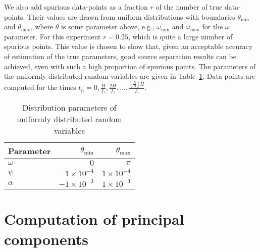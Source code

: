 We also add spurious data-points as a fraction $r$ of the number of true
data-points.  Their values are drawn from uniform distributions with boundaries
$\theta_{\text{min}}$ and $\theta_{\text{max}}$, where $\theta$ is some
parameter above, e.g., $\omega_{\text{min}}$ and $\omega_{\text{max}}$ for the
$\omega$ parameter. For this experiment $r = 0.25$, which is quite a large
number of spurious points. This value is chosen to show that, given an
acceptable accuracy of estimation of the true parameters, good source separation
results can be achieved, even with such a high proportion of spurious points.
The parameters of the uniformly distributed random variables are given in
Table~\ref{tab:amfmspuriousuniformparams}. Data-points are computed for the
times $t_{n} = 0,\frac{H}{f_{s}},\frac{2 H}{f_{s}},\ldots,\frac{\left\lfloor
\frac{N}{H} \right\rfloor H}{f_{s}}$.
\begin{table}
    \caption{Distribution parameters of uniformly distributed random
    variables\label{tab:amfmspuriousuniformparams}}
    \begin{center}
        \begin{tabular}{l r r}
            Parameter & $\theta_{\text{min}}$ & $\theta_{\text{max}}$ \\
            \hline
            $\omega$  & $0$ & $\pi$ \\
            $\psi$    & $-1 \times 10^{-4}$ & $1 \times 10^{-4}$ \\
            $\alpha$  & $-1 \times 10^{-3}$ & $1 \times 10^{-3}$ \\
        \end{tabular}
    \end{center}
\end{table}

\section{Computation of principal components}

